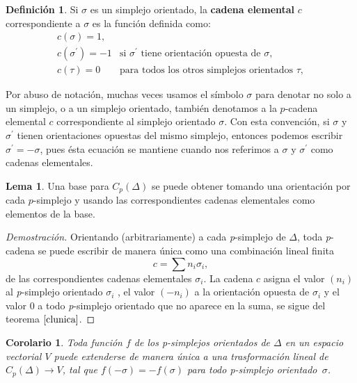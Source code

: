 \documentclass[12pt]{book}
\newtheorem{corollary}[theorem]{Corolario}
\theoremstyle{definition}
\newtheorem{definition}[theorem]{Definición}
\newtheorem{lemma}[theorem]{Lema}
\newcounter{in}
\newcounter{ini}
\begin{document}
\begin{definition}
  Si $\sigma$ es un simplejo orientado, la \textbf{cadena elemental} $c$
  correspondiente a $\sigma$ es la función definida como:
  \[ 
  \begin{array}{cl}
    c(\sigma)=1, & \\
    c(\sigma^{'})=-1 & \mbox{si $\sigma^{'}$ tiene orientación opuesta de $\sigma$}, \\
    c(\tau)=0 & \mbox{para todos los otros simplejos orientados $\tau$}, 
  \end{array}\] 
  \end{definition}

Por abuso de notación, muchas veces usamos el símbolo $\sigma$ para
denotar no solo a un simplejo, o a un simplejo orientado, también
denotamos a la $p$-cadena elemental $c$ correspondiente al simplejo
orientado $\sigma$. Con esta convención, si $\sigma$ y $\sigma^{'}$
tienen orientaciones opuestas del mismo simplejo, entonces podemos
escribir $\sigma^{'}=-\sigma$, pues ésta ecuación se mantiene cuando
nos referimos a $\sigma$ y $\sigma^{'}$ como cadenas elementales.

\begin{lemma}
   Una base para $C_{p}(\Delta)$ se puede obtener
   tomando una orientación por cada $p$-simplejo y usando las
   correspondientes cadenas elementales como elementos de la base.
\end{lemma}

\begin{proof}[Demostración]
  Orientando (arbitrariamente) a cada \emph{p}-simplejo de $\Delta$,
  toda \emph{p}-cadena se puede escribir de manera única como una
  combinación lineal finita
$$c=\sum n_{i}\sigma_{i},$$
de las correspondientes cadenas elementales $\sigma_{i}$. La cadena
$c$ asigna el valor $(n_{i})$ al \emph{p}-simplejo orientado
$\sigma_{i}$ , el valor $(-n_{i})$ a la orientación opuesta de
$\sigma_{i}$ y el valor $0$ a todo \emph{p}-simplejo orientado que no
aparece en la suma, se sigue del teorema $\ref{clunica}$.
\end{proof}

\begin{corollary}
  Toda función $f$ de los p-simplejos orientados de $\Delta$ en
  un espacio vectorial $V$ puede extenderse de manera única a una
  trasformación lineal de $C_{p}(\Delta)\rightarrow V$, tal que $f(-
  \sigma)=-f(\sigma)$ para todo p-simplejo orientado~$\sigma$.
\end{corollary}
\end{document}
